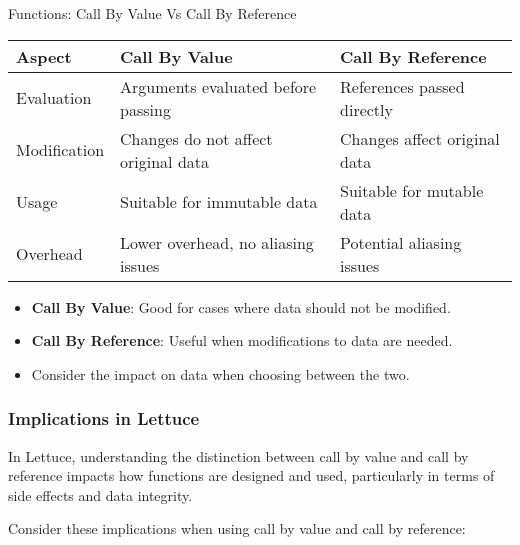 \begin{notes}{Functions: Call By Value Vs Call By Reference}
\begin{highlight}
        \begin{center}
            \begin{tabular}{|l|l|l|}
                \hline
                \textbf{Aspect} & \textbf{Call By Value} & \textbf{Call By Reference} \\
                \hline
                Evaluation & Arguments evaluated before passing & References passed directly \\
                \hline
                Modification & Changes do not affect original data & Changes affect original data \\
                \hline
                Usage & Suitable for immutable data & Suitable for mutable data \\
                \hline
                Overhead & Lower overhead, no aliasing issues & Potential aliasing issues \\
                \hline
            \end{tabular}
        \end{center}
    
        \begin{itemize}
            \item \textbf{Call By Value}: Good for cases where data should not be modified.
            \item \textbf{Call By Reference}: Useful when modifications to data are needed.
            \item Consider the impact on data when choosing between the two.
        \end{itemize}
    
    \end{highlight}
    
    \subsubsection*{Implications in Lettuce}
    
    In Lettuce, understanding the distinction between call by value and call by reference impacts how functions are designed and used, particularly in terms of side effects and data integrity.
    
    \begin{highlight}
    
        Consider these implications when using call by value and call by reference:
    

\end{highlight}
\end{notes}
